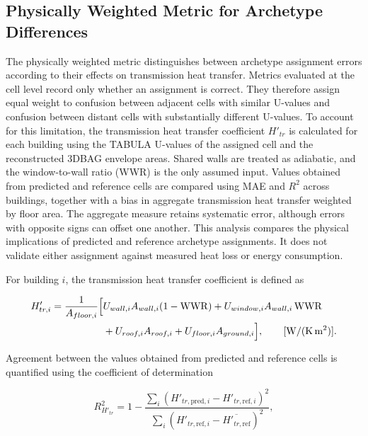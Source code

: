 \subsection{Physically Weighted Metric for Archetype Differences}
\label{sec:weighted_archetype_metric}

The physically weighted metric distinguishes between archetype assignment errors according to their effects on transmission heat transfer.
Metrics evaluated at the cell level record only whether an assignment is correct.
They therefore assign equal weight to confusion between adjacent cells with similar U-values and confusion between distant cells with substantially different U-values.
To account for this limitation, the transmission heat transfer coefficient $H'_{tr}$ is calculated for each building using the TABULA U-values of the assigned cell and the reconstructed 3DBAG envelope areas.
Shared walls are treated as adiabatic, and the window-to-wall ratio (WWR) is the only assumed input.
Values obtained from predicted and reference cells are compared using MAE and $R^2$ across buildings, together with a bias in aggregate transmission heat transfer weighted by floor area.
The aggregate measure retains systematic error, although errors with opposite signs can offset one another.
This analysis compares the physical implications of predicted and reference archetype assignments.
It does not validate either assignment against measured heat loss or energy consumption.

For building $i$, the transmission heat transfer coefficient is defined as

\begin{equation}
	\label{eq:htr}
	\begin{split}
		H'_{tr,i} = \frac{1}{A_{floor,i}} \Bigl[
		 & U_{wall,i}A_{wall,i}(1-\mathrm{WWR}) + U_{window,i}A_{wall,i}\,\mathrm{WWR}                     \\
		 & + U_{roof,i}A_{roof,i} + U_{floor,i}A_{ground,i} \Bigr], \qquad [\mathrm{W/(K\,m^2)}] .
	\end{split}
\end{equation}

Agreement between the values obtained from predicted and reference cells is quantified using the coefficient of determination

\begin{equation}
	\label{eq:htr_r2}
	R^2_{H'_{tr}}
	= 1 - \frac{\sum_i\left(H'_{tr,\mathrm{pred},i} - H'_{tr,\mathrm{ref},i}\right)^2}
	{\sum_i\left(H'_{tr,\mathrm{ref},i} - \overline{H'_{tr,\mathrm{ref}}}\right)^2},
\end{equation}

